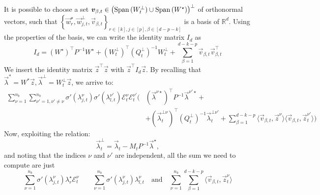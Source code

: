 It is possible to choose a set \({\boldsymbol{v}}_{\beta, t}\in\left(\operatorname{Span}{(W_t^\bot)}\cup\operatorname{Span}{(W^\star)}\right)^\bot\) of orthonormal vectors, such that 
\(
\left\{\vec w^\star_r,\vec w_{j,t}^\bot,\vec v_{\beta, t}\right\}_{r\in[k],j\in[p],\beta\in[d-p-k]}
\) is a basis of \(\mathbb R^d\).
Using the properties of the basis, we can write the identity matrix \(I_d\) as 
\[
    I_d = (W^\star)^\top P^{-1} W^\star + (W_t^\bot)^\top (Q_t^\bot)^{-1} W_t^\bot + \sum_{\beta=1}^{d-k-p} \vec v_{\beta, t} \vec v_{\beta, t}^\top
\]
We insert the identity matrix \(\vec z^\top \vec z\) with \(\vec z^\top I_d \vec z\). By recalling that $\vec \lambda^* = W^* \vec z, \vec \lambda^\bot = W_t^\bot \vec z$, we arrive to:
\[\begin{split}
    \sum_{\nu = 1}^{n_b} \sum_{\nu' = 1,\nu'\neq\nu}^{n_b} \sigma'(\lambda_{j,t}^\nu)\sigma'(\lambda_{l,t}^{\nu'})\mathcal{E}_t^\nu\mathcal{E}_t^{\nu'}
    \Bigg(&
        \left(\vec\lambda^{\nu\star}\right)^\top P^{-1} \vec\lambda^{\nu'\star} + \\
        & + \left(\vec\lambda_t^{\bot\nu}\right)^\top (Q_t^\bot)^{-1} \vec\lambda_t^{\bot\nu'} +
        \sum_{\beta=1}^{d-k-p} \langle \vec v_{\beta, t}, \vec z^\nu\rangle \langle\vec v_{\beta, t}, \vec z_t^{\nu'}\rangle
    \Bigg)
\end{split}\]
Now, exploiting the relation:
\[
   \vec \lambda_t^\bot = \vec \lambda_t - M_tP^{-1} \vec \lambda^\star,
\]
and noting that the indices \(\nu\) and \(\nu'\) are independent, all the sum we need to compute are just
\[
 \sum_{\nu = 1}^{n_b} \sigma'(\lambda_{j,t}^\nu)\lambda^{\star}_{r} \mathcal{E}_t^{\nu} \qquad 
 \sum_{\nu = 1}^{n_b} \sigma'(\lambda_{j,t}^\nu)\lambda_{l,t}^{\nu}
 \quad\text{and}\quad
 \sum_{\nu = 1}^{n_b} \sum_{\beta=1}^{d-k-p} \langle \vec v_{\beta, t}, \vec z_t^\nu\rangle 
\]



